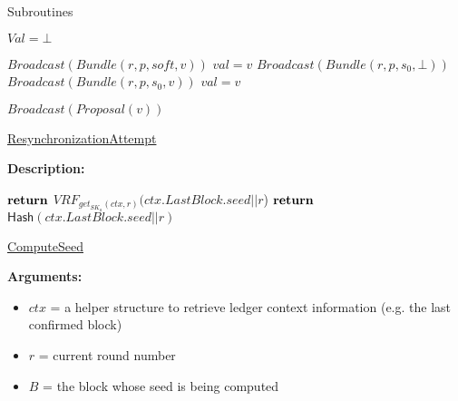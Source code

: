 \documentclass[10pt,a4paper]{article}
\begin{document}
\begin{section}{Subroutines}

\begin{algorithm}[H]
    \begin{algorithmic}[1]

    \State $Val = \bot$

        \State $Broadcast(Bundle(r, p, soft, v))$
        \State $val = v$    
        \State $Broadcast(Bundle(r, p, s_0, \bot))$
        \State $Broadcast(Bundle(r, p, s_0, v))$
        \State $val = v$   
    \EndIf

        \State $Broadcast(Proposal(v))$
    \EndIf

    \EndFunction
    \end{algorithmic}
    \caption{\underline{ResynchronizationAttempt}}
\end{algorithm}

\noindent \textbf{Description:}\\


\begin{algorithm}[H]
    \begin{algorithmic}[1]
            \State $\Return$ $VRF_{get_{SK_a}(ctx, r)}(ctx.LastBlock.seed||r$)
        \Else
            \State $\Return$ $\mathsf{Hash}(ctx.LastBlock.seed||r)$
        \EndIf
    \EndFunction
    \end{algorithmic}
    \caption{\underline{ComputeSeed}}
\end{algorithm}


\noindent \textbf{Arguments:}
\begin{itemize}
    \item $ctx$ = a helper structure to retrieve ledger context information (e.g. the last confirmed block)
    \item $r$ = current round number
    \item $B$ = the block whose seed is being computed
  \end{itemize}



\end{section}
\end{document}
